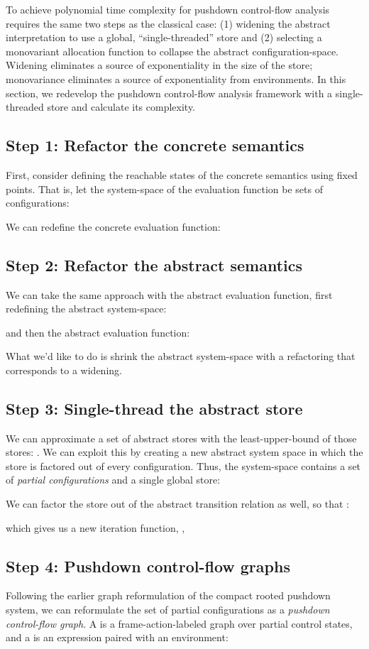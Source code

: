 To achieve polynomial time complexity for pushdown control-flow
analysis requires the same two steps as the classical case: (1)
widening the abstract interpretation to use a global,
``single-threaded'' store and (2) selecting a monovariant allocation
function to collapse the abstract configuration-space.
Widening eliminates a source of exponentiality in the size of the
store; monovariance eliminates a source of exponentiality from
environments.
In this section, we redevelop the pushdown control-flow analysis
framework with a single-threaded store and calculate
its complexity.



\subsection{Step 1: Refactor the concrete semantics}
First, consider defining the reachable states of the concrete
semantics using fixed points.
That is, let the system-space of the evaluation function be
sets of configurations:

We can redefine the concrete evaluation function:


\subsection{Step 2: Refactor the abstract semantics}
We can take the same approach with the abstract evaluation function,
first redefining the abstract system-space:

and then the abstract evaluation function:

What we'd like to do is shrink the abstract system-space with a
refactoring that corresponds to a widening.

\subsection{Step 3: Single-thread the abstract store}
We can approximate a set of abstract stores
 with 
the least-upper-bound of those stores: .
We can exploit this by creating a new abstract system space in which
the store is factored out of every configuration.
Thus, the system-space contains a set of \emph{partial configurations}
and a single global store:

We can factor the store out of the abstract transition relation as well, so that
:

which gives us a new iteration function,
,


\subsection{Step 4: Pushdown control-flow graphs}
Following the earlier graph reformulation of the compact rooted
pushdown system, we can reformulate the set of partial
configurations as a \emph{pushdown control-flow graph}.
A  is a frame-action-labeled
graph over partial control states, and a  is an expression paired with an environment:

